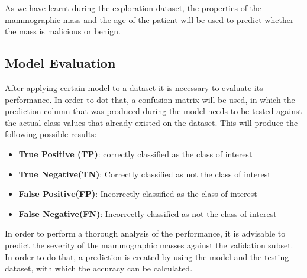 \documentclass[a4paper,12pt]{article}\usepackage[]{graphicx}\usepackage[]{color}
\begin{document}
As we have learnt during the exploration dataset, the properties of the mammographic mass and the age of the patient will be used to predict whether the mass is malicious or benign.

\clearpage

\subsection{Model Evaluation}\label{evaluation}
After applying certain model to a dataset it is necessary to evaluate its performance. In order to dot that, a confusion matrix will be used, in which the prediction column that was produced during the model needs to be tested against the actual class values that already existed on the dataset. This will produce the following possible results:
\begin{itemize}
  \item \textbf{True Positive (TP)}: correctly classified as the class of interest
  \item \textbf{True Negative(TN)}: Correctly classified as not the class of interest
  \item \textbf{False Positive(FP)}: Incorrectly classified as the class of interest
  \item \textbf{False Negative(FN)}: Incorrectly classified as not the class of interest
\end{itemize}

In order to perform a thorough analysis of the performance, it is advisable to predict the severity of the mammographic masses against the validation subset. In order to do that, a prediction is created by using the model and the testing dataset, with which the accuracy can be calculated.
\end{document}

